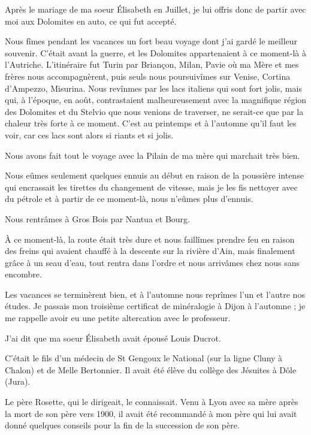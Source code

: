\documentclass[11pt,a4paper]{report}
\begin{document}
Après le mariage de ma soeur Élisabeth en Juillet, je lui offris donc de partir avec moi aux Dolomites en auto, ce qui fut accepté.

Nous fîmes pendant les vacances un fort beau voyage dont j'ai gardé le meilleur souvenir. C'était avant la guerre, et les Dolomites appartenaient à ce moment-là à l'Autriche. L'itinéraire fut Turin par Briançon, Milan, Pavie où ma Mère et mes frères nous accompagnèrent, puis seuls nous poursuivîmes sur Venise, Cortina d'Ampezzo, Misurina. Nous revînmes par les lacs italiens qui sont fort jolis, mais qui, à l'époque, en août, contrastaient malheureusement avec la magnifique région des Dolomites et du Stelvio que nous venions de traverser, ne serait-ce que par la chaleur très forte à ce moment. C'est au printemps et à l'automne qu'il faut les voir, car ces lacs sont alors si riants et si jolis.

Nous avons fait tout le voyage avec la Pilain de ma mère qui marchait très bien.

Nous eûmes seulement quelques ennuis au début en raison de la poussière intense qui encrassait les tirettes du changement de vitesse, mais je les fis nettoyer avec du pétrole et à partir de ce moment-là, nous n'eûmes plus d'ennuis.

Nous rentrâmes à Gros Bois par Nantua et Bourg.

À ce moment-là, la route était très dure et nous faillîmes prendre feu en raison des freins qui avaient chauffé à la descente sur la rivière d'Ain, mais finalement grâce à un seau d'eau, tout rentra dans l'ordre et nous arrivâmes chez nous sans encombre.

Les vacances se terminèrent bien, et à l'automne nous reprîmes l'un et l'autre nos études. Je passais mon troisième certificat de minéralogie à Dijon à l'automne ; je me rappelle avoir eu une petite altercation avec le professeur.

J'ai dit que ma soeur Élisabeth avait épousé Louis Ducrot.

C'était le fils d'un médecin de St Gengoux le National (sur la ligne Cluny à Chalon) et de Melle Bertonnier. Il avait été élève du collège des Jésuites à Dôle (Jura).

Le père Rosette, qui le dirigeait, le connaissait. Venu à Lyon avec sa mère après la mort de son père vers 1900, il avait été recommandé à mon père qui lui avait donné quelques conseils pour la fin de la succession de son père.
\end{document}
